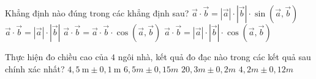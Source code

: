 \begin{ex}%
    Khẳng định nào đúng trong các khẳng định sau?
    \choice
    {$\overrightarrow{a}\cdot \overrightarrow{b}=\left|\overrightarrow{a}\right|\cdot \left|\overrightarrow{b}\right|\cdot \sin (\overrightarrow{a}, \overrightarrow{b})$}
    {$\overrightarrow{a}\cdot \overrightarrow{b}=\left|\overrightarrow{a}\right|\cdot \left|\overrightarrow{b}\right|$}
    {$\overrightarrow{a}\cdot \overrightarrow{b}=\overrightarrow{a}\cdot \overrightarrow{b}\cdot \cos (\overrightarrow{a}, \overrightarrow{b})$}
    {\True $\overrightarrow{a}\cdot \overrightarrow{b}=\left|\overrightarrow{a}\right|\cdot \left|\overrightarrow{b}\right|\cdot \cos \left(\overrightarrow{a}, \overrightarrow{b}\right)$}
\end{ex}
\begin{ex}%
    Thực hiện đo chiều cao của $4$ ngôi nhà, kết quả đo đạc nào trong các kết quả sau chính xác nhất?
    \choice
    {$4{,}5 \mathrm{~m} \pm 0{,}1 \mathrm{~m}$}
    {$6{,}5 m \pm 0{,}15 m$}
    {\True $20{,}3 m \pm 0{,}2 m$}
    {$4{,}2 m \pm 0{,}12 m$}
\end{ex}
